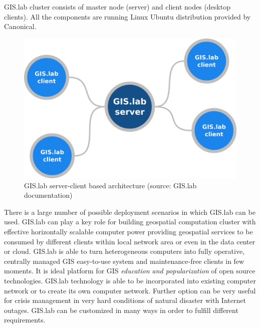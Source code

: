 \documentclass{isprs}
\begin{document}
GIS.lab cluster consists of master node (server) and client nodes
(desktop clients). All the components are running Linux Ubuntu
distribution provided by Canonical.

\begin{figure}[ht!]
\begin{center}
  \includegraphics[width=.7\columnwidth]{figures/gislab-server-client-architecture.png}
  \caption{GIS.lab server-client based architecture (source: GIS.lab
    documentation)}
\label{fig:gislab_infrastructure}
\end{center}
\end{figure}

There is a large number of possible deployment scenarios in which
GIS.lab can be used. GIS.lab can play a key role for building
geospatial computation cluster with effective horizontally scalable
computer power providing geospatial services to be consumed by
different clients within local network area or even in the data center
or cloud. GIS.lab is able to turn heterogeneous computers into fully
operative, centrally managed GIS easy-to-use system and
maintenance-free clients in few moments. It is ideal platform for GIS
\textit{education and popularization} of open source
technologies. GIS.lab technology is able to be incorporated into
existing computer network or to create its own computer
network. Further option can be very useful for crisis management in
very hard conditions of natural disaster with Internet
outages. GIS.lab can be customized in many ways in order to fulfill
different requirements.
\end{document}
